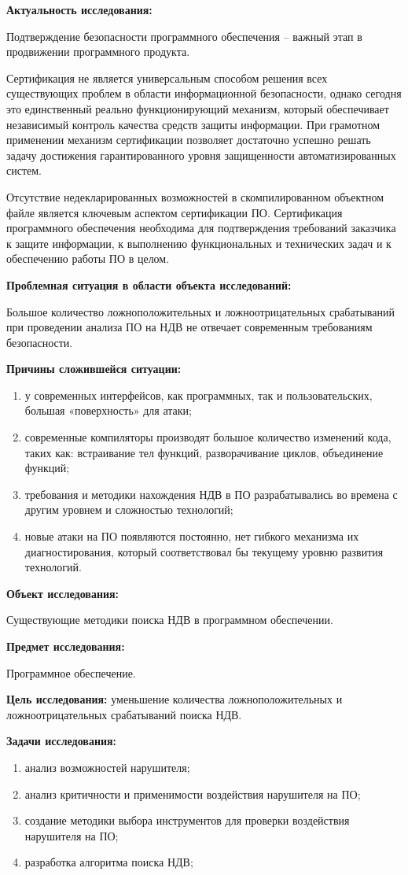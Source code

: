 \textbf{Актуальность исследования:}

Подтверждение безопасности программного обеспечения -- важный этап
в продвижении программного продукта.

Сертификация не является универсальным способом
решения всех существующих проблем в
области информационной безопасности, однако
сегодня это единственный реально функционирующий
механизм, который обеспечивает независимый
контроль качества средств защиты информации.
При грамотном применении механизм сертификации
позволяет достаточно успешно решать задачу
достижения гарантированного уровня защищенности автоматизированных систем.

Отсутствие недекларированных возможностей в скомпилированном
объектном файле является ключевым аспектом сертификации ПО.
Сертификация программного обеспечения необходима для
подтверждения требований заказчика к защите
информации, к выполнению функциональных
и технических задач и к обеспечению работы ПО в целом.


\textbf{Проблемная ситуация в области объекта исследований:}

Большое количество ложноположительных и ложноотрицательных срабатываний при проведении анализа ПО на НДВ не отвечает современным требованиям безопасности.

\textbf{Причины сложившейся ситуации:}
\begin{enumerate}[label={\arabic*)}]
    \item у современных интерфейсов, как программных, так и пользовательских, большая «поверхность» для атаки;
    \item современные компиляторы производят большое количество изменений кода, таких как: встраивание тел функций, разворачивание циклов, объединение функций;
    \item требования и методики нахождения НДВ в ПО разрабатывались во времена с другим уровнем и сложностью технологий;
    \item новые атаки на ПО появляются постоянно, нет гибкого механизма их диагностирования, который соответствовал бы текущему уровню развития технологий.
\end{enumerate}

\textbf{Объект исследования:}

Существующие методики поиска НДВ в программном обеспечении.

\textbf{Предмет исследования:}

Программное обеспечение.

\textbf{Цель исследования:}
уменьшение количества ложноположительных и ложноотрицательных срабатываний поиска НДВ.

\textbf{Задачи исследования:}
\begin{enumerate}[label={\arabic*)}]
    \item анализ возможностей нарушителя;
    \item анализ критичности и применимости воздействия нарушителя на ПО;
    \item создание методики выбора инструментов для проверки воздействия нарушителя на ПО;
    \item разработка алгоритма поиска НДВ;
\end{enumerate}
